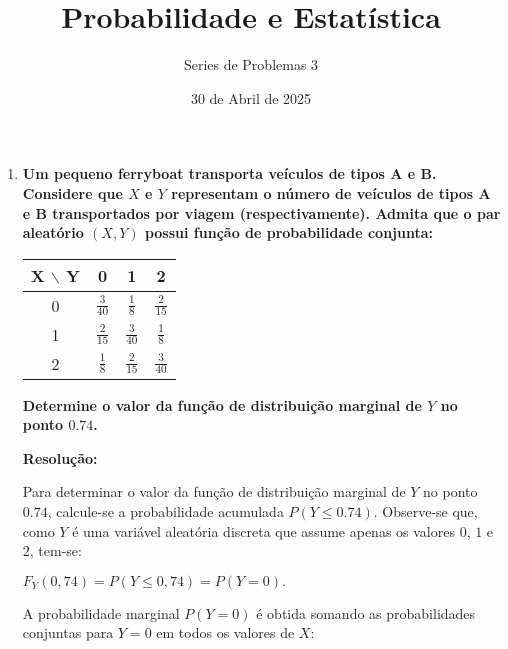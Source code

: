 \documentclass[a4paper,12pt]{article}
\author{Series de Problemas 3}
\begin{document}
\title{Probabilidade e Estatística}
\date{30 de Abril de 2025}
\maketitle

\begin{enumerate}
  \item \textbf{Um pequeno ferryboat transporta veículos de tipos A e B. Considere que 
  $X$ e $Y$ representam o número de veículos de tipos A e B transportados por viagem (respectivamente). Admita que o par aleatório 
  $(X, Y)$ possui função de probabilidade conjunta:}

  \vspace{0.3cm}

  \begin{center}
    \small
    \renewcommand{\arraystretch}{1.8}  %
    \setlength{\tabcolsep}{12pt}       %
    \begin{tabular}{|c|c|c|c|}
      \hline
      X \(\backslash\) Y & 0 & 1 & 2 \\ \hline
      0 & $\frac{3}{40}$ & $\frac{1}{8}$   & $\frac{2}{15}$ \\ \hline
      1 & $\frac{2}{15}$ & $\frac{3}{40}$ & $\frac{1}{8}$   \\ \hline
      2 & $\frac{1}{8}$  & $\frac{2}{15}$ & $\frac{3}{40}$ \\ \hline
    \end{tabular}
  \end{center}

  \textbf{Determine o valor da função de distribuição marginal de $Y$ no ponto $0.74$.}

  \vspace{0.3cm}

  \begin{mdframed}[backgroundcolor=gray!10, linewidth=0pt, innertopmargin=10pt, innerbottommargin=10pt]
  \textbf{Resolução:}
  
  Para determinar o valor da função de distribuição marginal de $Y$ no ponto $0.74$, calcule-se a probabilidade acumulada $P(Y \leq 0.74)$. Observe-se que, como $Y$ é uma variável aleatória discreta que assume apenas os valores $0$, $1$ e $2$, tem-se:
  
  \begin{center}
  $F_Y(0,74) = P(Y \leq 0,74) = P(Y = 0).$
  \end{center}

  A probabilidade marginal $P(Y = 0)$ é obtida somando as probabilidades conjuntas para $Y = 0$ em todos os valores de $X$:


\end{mdframed}
\end{enumerate}
\end{document}
